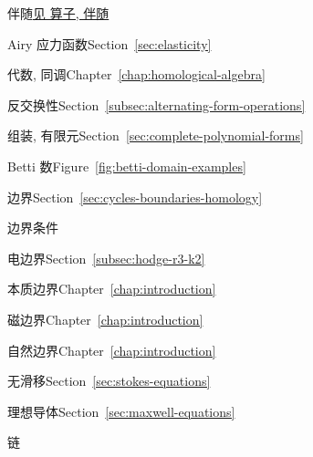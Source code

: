 \renewcommand{\indexname}{索引}
\begin{theindex}\label{back:index}

\item {}\label{index:adjoint}{伴随}\quad \hyperref[index:operator-adjoint]{{见 算子, 伴随}}

\item {}\label{index:airy-stress-function}{Airy 应力函数}\quad Section~\ref{sec:elasticity}

\item {}\label{index:algebra-homological}{代数, 同调}\quad Chapter~\ref{chap:homological-algebra}

\item {}\label{index:anticommutativity}{反交换性}\quad Section~\ref{subsec:alternating-form-operations}

\item {}\label{index:assembly-finite-element}{组装, 有限元}\quad Section~\ref{sec:complete-polynomial-forms}

\item {}\label{index:betti-number}{Betti 数}\quad Figure~\ref{fig:betti-domain-examples}

\item {}\label{index:boundary}{边界}\quad Section~\ref{sec:cycles-boundaries-homology}

\item {}\label{index:boundary-conditions}{边界条件}

\subitem {}\label{index:boundary-conditions-electric}{电边界}\quad Section~\ref{subsec:hodge-r3-k2}

\subitem {}\label{index:boundary-conditions-essential}{本质边界}\quad Chapter~\ref{chap:introduction}

\subitem {}\label{index:boundary-conditions-magnetic}{磁边界}\quad Chapter~\ref{chap:introduction}

\subitem {}\label{index:boundary-conditions-natural}{自然边界}\quad Chapter~\ref{chap:introduction}

\subitem {}\label{index:boundary-conditions-no-slip}{无滑移}\quad Section~\ref{sec:stokes-equations}

\subitem {}\label{index:boundary-conditions-perfect-conductor}{理想导体}\quad Section~\ref{sec:maxwell-equations}

\item {}\label{index:chain}{链}


\end{theindex}
